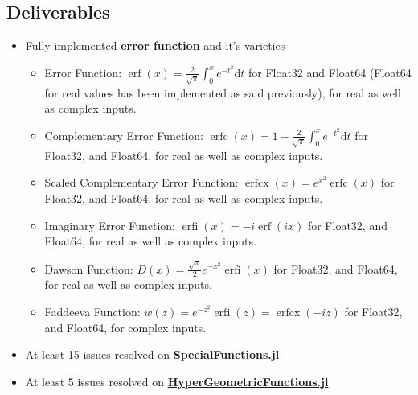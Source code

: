 \documentclass{article}
\theoremstyle{mytheoremstyle}
\theoremstyle{mytheoremstyle}
\theoremstyle{myproblemstyle}
\begin{document}
    \subsection*{Deliverables}
      \begin{itemize}
        \item Fully implemented \href{https://github.com/JuliaMath/SpecialFunctions.jl/blob/master/src/erf.jl}{\textbf{error function}} and it's varieties \cite{error function}
          \begin{itemize}
            \item Error Function: $\operatorname{erf } (x)=\frac{2 }{\sqrt{\pi } }\int_{0}^{x} e ^{-t^2}\text{d}t$ for Float32 and Float64 (Float64 for real values has been implemented as said previously), for real as well as complex inputs.
            \item Complementary Error Function: $\operatorname{erfc } (x)=1- \frac{2 }{\sqrt{\pi } }\int_{0}^{x} e ^{-t^2}\text{d}t$ for Float32, and Float64, for real as well as complex inputs.
            \item Scaled Complementary Error Function: $\operatorname{erfcx } (x)=e ^{x^2 } \operatorname{erfc} (x)$ for Float32, and Float64, for real as well as complex inputs.
            \item Imaginary Error Function: $\operatorname{erfi } (x)= -i \operatorname{erf} (ix)$ for Float32, and Float64, for real as well as complex inputs.
            \item Dawson Function: $D (x)=\frac{\sqrt{\pi } }{2 }e ^{-x^2 } \operatorname{erfi} (x)$ for Float32, and Float64, for real as well as complex inputs.
            \item Faddeeva Function: $w (z)=e ^{-z^2 } \operatorname{erfi} (z)= \operatorname{erfcx}(-iz)$ for Float32, and Float64, for complex inputs.
          \end{itemize}
        \item At least 15 issues resolved on \href{https://github.com/JuliaMath/SpecialFunctions.jl/issues}{\textbf{SpecialFunctions.jl}} 
        \item At least 5 issues resolved on \href{https://github.com/JuliaMath/HypergeometricFunctions.jl/issues}{\textbf{HyperGeometricFunctions.jl}} 

\end{itemize}
\end{document}
